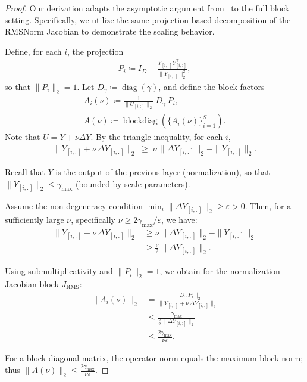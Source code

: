 \documentclass{zapiski}
\theoremstyle{plain}
\theoremstyle{definition}
\theoremstyle{remark}
\DeclareMathOperator{\RMS}{RMS}
\begin{document}
\begin{proof}
Our derivation adapts the asymptotic argument from~\cite{tomihari2025recurrentselfattentiondynamicsenergyagnostic} to the full block setting. Specifically, we utilize the same projection-based decomposition of the RMSNorm Jacobian to demonstrate the scaling behavior.

Define, for each $i$, the projection
\begin{align}
P_i \coloneqq I_D - \frac{Y_{[i,:]}Y_{[i,:]}^{\top}}{\|Y_{[i,:]}\|_{2}^2},
\end{align}
so that $\| P_i\|_{2} = 1$.  
Let $D_{\gamma} \coloneqq \operatorname{diag}(\gamma)$, and define the block factors
\begin{align}
A_i(\nu) \coloneqq \frac{1}{\| U_{[i,:]} \|_{2}}\,D_{\gamma}\,P_i,
\\
A(\nu) \coloneqq \operatorname{blockdiag}\left(\{A_i(\nu)\}_{i=1}^S\right).
\end{align}
Note that $U = Y + \nu \Delta Y$. By the triangle inequality, for each $i$,
\begin{align}
\| Y_{[i,:]}+\nu\,\Delta Y_{[i,:]} \|_{2}
\;\ge\; \nu\,\| \Delta Y_{[i,:]}\|_{2} - \| Y_{[i,:]}\|_{2}.
\end{align}

Recall that $Y$ is the output of the previous layer (normalization), so that $\|Y_{[i,:]}\|_{2} \leq \gamma_{\max}$ (bounded by scale parameters).

Assume the non-degeneracy condition $\min_i \|\Delta Y_{[i,:]}\|_{2} \ge \varepsilon > 0$.  
Then, for a sufficiently large $\nu$, specifically $\nu \ge 2\gamma_{\max} /\varepsilon$, we have:
\begin{align}
\| Y_{[i,:]}+\nu\,\Delta Y_{[i,:]} \|_{2}
&\ge  \nu\,\|\Delta Y_{[i,:]} \|_{2} - \|Y_{[i,:]}\|_{2} \\
&\ge \frac{\nu}{2}\,\|\Delta Y_{[i,:]}\|_{2}.
\end{align}

Using submultiplicativity and $\|P_i\|_{2}=1$, we obtain for the normalization Jacobian block $J_{\RMS}$:
\begin{align}
\| A_i(\nu) \|_{2}
&= \frac{\| D_{\gamma}\,P_i\|_{2}}{\| Y_{[i,:]}+\nu\,\Delta Y_{[i,:]} \|_{2}} \\
&\le \frac{\gamma_{\max}}{\frac{\nu}{2} \|\Delta Y_{[i,:]}\|_{2}} \\
&\le \frac{2\gamma_{\max}}{\nu \varepsilon}.
\end{align}

For a block-diagonal matrix, the operator norm equals the maximum block norm; thus $\| A(\nu) \|_{2} \le \frac{2\gamma_{\max}}{\nu \varepsilon}$.


\end{proof}
\end{document}

